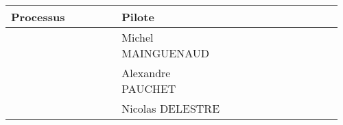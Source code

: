  \begin{center}
 \begin{tabular}{|p{0.32\linewidth}|p{0.32\linewidth}|p{0.32\linewidth}|}
     \hline  %
     \rowcolor[gray]{.8}
     Processus   & Pilote     \\
     \hline
     \processusUn{} & Michel MAINGUENAUD \\
     \hline
     \processusDeux{}  &  Alexandre PAUCHET \\
     \hline
     \processusTrois{}  & Nicolas DELESTRE \\
     \hline
   \end{tabular}
 \end{center}
